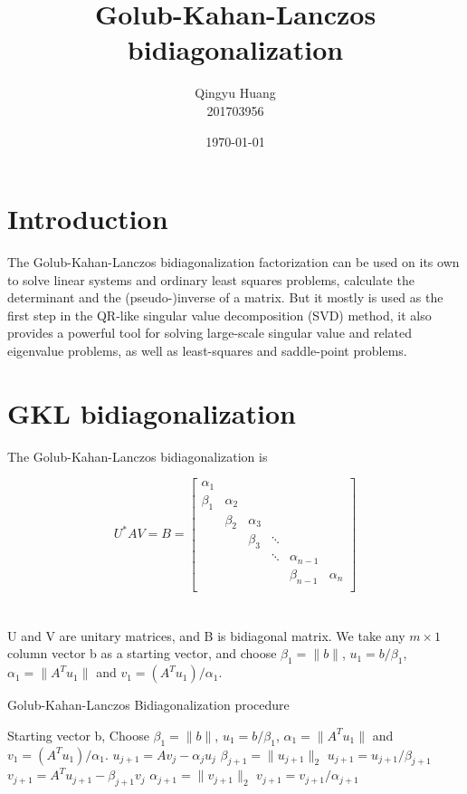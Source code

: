 \documentclass[oneside, 12pt, a4paper]{article}
\title{Golub-Kahan-Lanczos bidiagonalization}
\author{Qingyu Huang \\
201703956}
\date{\today}
\begin{document}
\maketitle

\section*{Introduction}

The Golub-Kahan-Lanczos bidiagonalization factorization can be used on its own to solve linear systems and ordinary least squares problems, calculate the determinant and the (pseudo-)inverse of a matrix. But it mostly is used as the first step in the QR-like singular value decomposition (SVD) method, it also provides a powerful tool for solving large-scale singular value and related eigenvalue problems, as well as least-squares and saddle-point problems.


\section*{GKL bidiagonalization}

The Golub-Kahan-Lanczos bidiagonalization is 

\[{{U}^{*}}AV=B=\left[ \begin{matrix}
   {{\alpha }_{1}} & {} & {} & {} & {} & {}  \\
   {{\beta }_{1}} & {{\alpha }_{2}} & {} & {} & {} & {}  \\
   {} & {{\beta }_{2}} & {{\alpha }_{3}} & {} & {} & {}  \\
   {} & {} & {{\beta }_{3}} & \ddots  & {} & {}  \\
   {} & {} & {} & \ddots  & {{\alpha }_{n-1}} & {}  \\
   {} & {} & {} & {} & {{\beta }_{n-1}} & {{\alpha }_{n}}  \\
\end{matrix} \right]\]\\
\\
U and V are unitary matrices, and B is bidiagonal matrix. We take any $m \times 1$ column vector b as a starting vector, and choose $\beta_1 = \|b\|$, $u_1 = b/\beta_1$, $\alpha_1 = \|A^T u_1\|$ and $v_1 = (A^T u_1)/\alpha_1$. 

\begin{algorithm}[h]  
  \caption{Golub-Kahan-Lanczos Bidiagonalization procedure}  
  \begin{algorithmic}[1]  
	\State Starting vector b, Choose $\beta_1 = \|b\|$, $u_1 = b/\beta_1$, $\alpha_1 = \|A^T u_1\|$ and $v_1 = (A^T u_1)/\alpha_1$.
      \State $u_{j+1} = Av_j - \alpha_j u_j$
      \State $\beta_{j+1} = \|u_{j+1}\|_2$  
	 \State $u_{j+1} = u_{j+1}/\beta_{j+1}$
	 \State $v_{j+1} = A^T u_{j+1} - \beta_{j+1} v_j$
      \State $\alpha_{j+1} = \|v_{j+1}\|_2$ 
      \State $v_{j+1} = v_{j+1}/\alpha_{j+1}$ 
    \EndFor  
  \end{algorithmic}  
\end{algorithm}  
\end{document}
